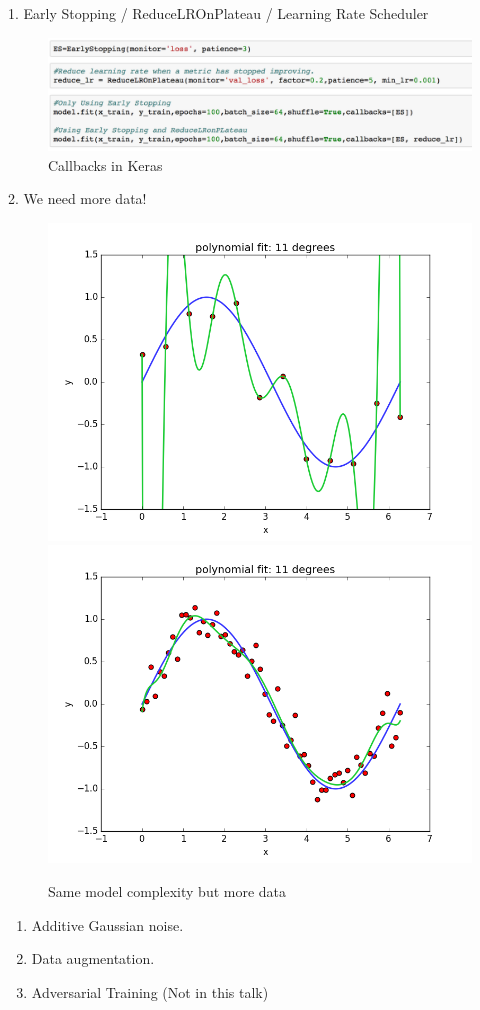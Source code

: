 \documentclass[xcolor=pdftex,dvipsnames,table,mathserif]{beamer}
\begin{document}
\begin{frame}{1. Early Stopping / ReduceLROnPlateau / Learning Rate Scheduler}
\begin{figure}
\includegraphics[width=1 \columnwidth]{../graphics/CallBacksKeras}
\caption{Callbacks in Keras}
\end{figure}
\end{frame}

\begin{frame}{2. We need more data!}
\begin{figure}
\includegraphics[width=.45 \columnwidth]{../graphics/polyfit_degree_11}
\includegraphics[width=.45 \columnwidth]{../graphics/polyfit_degree_11_N60.png}
\caption{Same model complexity but more data}
\end{figure}
\begin{enumerate}
\item Additive Gaussian noise.
\item Data augmentation.
\item Adversarial Training (Not in this talk)
\end{enumerate}
\end{frame}
\end{document}
